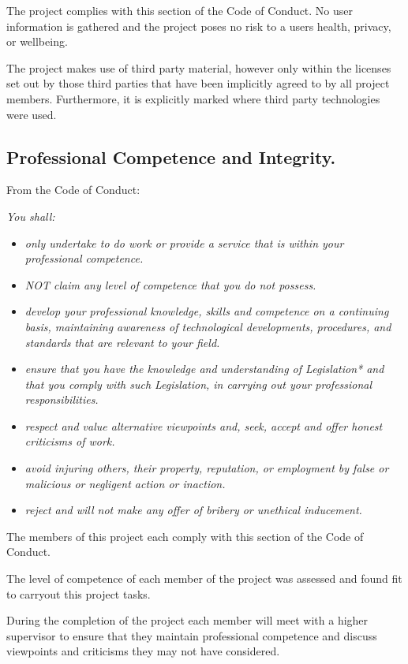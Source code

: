 \documentclass[a4paper]{report}
\begin{document}
The project complies with this section of the Code of Conduct. No user information is gathered and the project poses no risk to a users health, privacy, or wellbeing.

The project makes use of third party material, however only within the licenses set out by those third parties that have been implicitly agreed to by all project members. Furthermore, it is explicitly marked where third party technologies were used.


\subsection*{Professional Competence and Integrity.}

From the Code of Conduct: \cite{CoC}

\textit{You shall:}
\begin{itemize}
\item \textit{only undertake to do work or provide a service that is within your professional competence.}
\item \textit{NOT claim any level of competence that you do not possess.}
\item \textit{develop your professional knowledge, skills and competence on a continuing basis, maintaining awareness of technological developments, procedures, and standards that are relevant to your field.}
\item \textit{ensure that you have the knowledge and understanding of Legislation* and that you comply with such Legislation, in carrying out your professional responsibilities. }
\item \textit{respect and value alternative viewpoints and, seek, accept and offer honest criticisms of work.}
\item \textit{avoid injuring others, their property, reputation, or employment by false or malicious or negligent action or inaction.}
\item \textit{reject and will not make any offer of bribery or unethical inducement.}
\end{itemize}

The members of this project each comply with this section of the Code of Conduct.

The level of competence of each member of the project was assessed and found fit to carryout this project tasks.

During the completion of the project each member will meet with a higher supervisor to ensure that they maintain professional competence and discuss viewpoints and criticisms they may not have considered.
\end{document}
